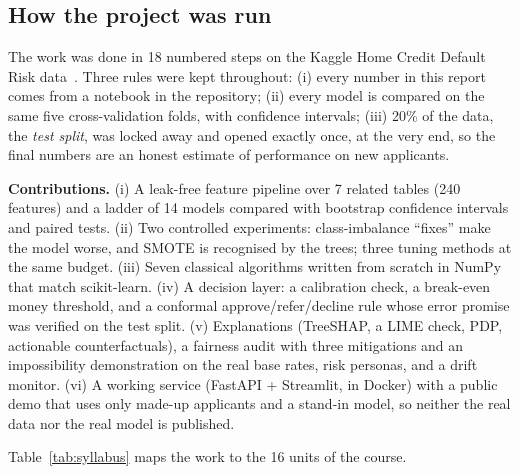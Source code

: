 \documentclass[conference,10pt]{IEEEtran}
\begin{document}
\subsection{How the project was run}
The work was done in 18 numbered steps on the Kaggle Home Credit Default Risk
data~\cite{homecredit2018}. Three rules were kept throughout:
(i) every number in this report comes from a notebook in the repository;
(ii) every model is compared on the same five cross-validation folds, with confidence intervals;
(iii) 20\% of the data, the \emph{test split}, was locked away and opened exactly once, at the
very end, so the final numbers are an honest estimate of performance on new applicants.

\textbf{Contributions.}
(i) A leak-free feature pipeline over 7 related tables (240 features) and a ladder of 14 models
compared with bootstrap confidence intervals and paired tests.
(ii) Two controlled experiments: class-imbalance ``fixes'' make the model worse, and SMOTE is
recognised by the trees; three tuning methods at the same budget.
(iii) Seven classical algorithms written from scratch in NumPy that match scikit-learn.
(iv) A decision layer: a calibration check, a break-even money threshold, and a conformal
approve/refer/decline rule whose error promise was verified on the test split.
(v) Explanations (TreeSHAP, a LIME check, PDP, actionable counterfactuals), a fairness audit
with three mitigations and an impossibility demonstration on the real base rates, risk personas,
and a drift monitor.
(vi) A working service (FastAPI + Streamlit, in Docker) with a public demo that uses only made-up
applicants and a stand-in model, so neither the real data nor the real model is published.

Table~\ref{tab:syllabus} maps the work to the 16 units of the course.
\end{document}
